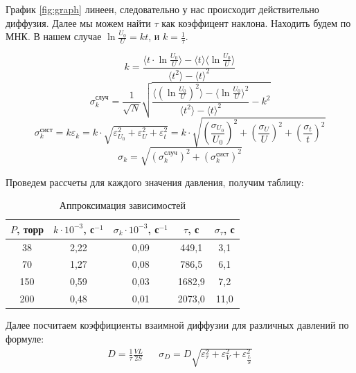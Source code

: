 \documentclass[
a4paper, %
12pt, %
]{article}
\begin{document}
	График \ref{fig:graph} линеен, следовательно у нас происходит действительно диффузия. Далее мы можем найти $\tau$ как коэффицент наклона. Находить будем по МНК. В нашем случае $\ln\frac{U_0}{U} = k t$, и $k = \frac{1}{\tau}$.
	
	\begin{equation}
		k=\frac{\langle t\cdot \ln \frac{U_0}{U} \rangle - \langle t\rangle \langle \ln \frac{U_0}{U}\rangle}{\langle t^2 \rangle - \langle t \rangle^2} 
	\end{equation}
	\begin{equation}
		\sigma_k^\text{случ}=\frac{1}{\sqrt{N}}\sqrt{\frac{\langle \left(\ln\frac{U_0}{U}\right)^2 \rangle - \langle \ln\frac{U_0}{U} \rangle^2}{\langle t^2 \rangle - \langle t \rangle^2} - k^2  }
	\end{equation}
	\begin{equation}
		\sigma_k^{\text{сист}} = k\varepsilon_k =  k\cdot\sqrt{\varepsilon_{U_0}^2 + \varepsilon_U^2 + \varepsilon_t^2} = k\cdot\sqrt{\left(\frac{\sigma_{U_0}}{U_0}\right)^2+ \left(\frac{\sigma_{U}}{U}\right)^2 + \left(\frac{\sigma_t}{t}\right)^2} 
	\end{equation}
	\begin{equation}
		\sigma_k = \sqrt{\left( \sigma_k^\text{случ} \right)^2 + \left( \sigma_k^\text{сист} \right)^2 }
	\end{equation}
	
	\newpage
	
	Проведем рассчеты для каждого значения давления, получим таблицу:
	
	\begin{table}[h!]
		\centering
		\begin{tabular}{|c|c|c|c|c|}
			\hline
			$ P $, торр & $ k \cdot 10^{-3} $, с$ ^{-1} $ & $ \sigma_{k} \cdot 10^{-3} $, с$ ^{-1} $ & $ \tau $, с & $ \sigma_\tau $, с \\ \hline
			38 & 2,22 & 0,09 & 449,1 & 3,1 \\ \hline
			70 & 1,27 & 0,08 & 786,5 & 6,1  \\ \hline
			150 & 0,59 & 0,03 & 1682,9 & 7,2  \\ \hline
			200 & 0,48 & 0,01 & 2073,0 & 11,0 \\ \hline
		\end{tabular}
		\caption{Аппроксимация зависимостей}
		\label{tab:approx}
	\end{table}
	
	Далее посчитаем коэффициенты взаимной диффузии для различных давлений по формуле:
	\begin{align}
		D = \frac{1}{\tau}\frac{VL}{2S} & & \sigma_D = D\sqrt{\varepsilon_\tau^2 + \varepsilon_V^2  + \varepsilon_{\frac{L}{S}}^2}
	\end{align}
	
\end{document}
